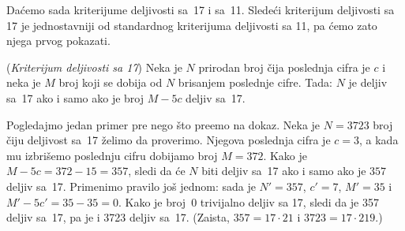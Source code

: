 
Da\'cemo sada kriterijume deljivosti sa~17 i sa~11. Slede\'ci kriterijum deljivosti sa 17 je jednostavniji od
standardnog kriterijuma deljivosti sa 11, pa \'cemo zato njega prvog pokazati.

\begin{EX} (\textit{Kriterijum deljivosti sa 17})
  Neka je $N$ prirodan broj \v cija poslednja cifra je $c$ i neka je $M$ broj koji se dobija od $N$ brisanjem poslednje cifre.
  Tada: $N$ je deljiv sa~17 ako i samo ako je broj $M - 5c$ deljiv sa~17.
\end{EX}

Pogledajmo jedan primer pre nego \v sto pre\dj emo na dokaz. Neka je $N = 3723$ broj \v ciju deljivost sa~17
\v zelimo da proverimo. Njegova poslednja cifra je $c = 3$, a kada mu izbri\v semo poslednju cifru dobijamo broj $M = 372$.
Kako je $M - 5c = 372 - 15 = 357$, sledi da \'ce $N$ biti deljiv sa~17 ako i samo ako je $357$ deljiv sa~17.
Primenimo pravilo jo\v s jednom: sada je $N' = 357$, $c' = 7$, $M' = 35$ i $M' - 5c' = 35 - 35 = 0$.
Kako je broj~0 trivijalno deljiv sa 17, sledi da je 357 deljiv sa~17, pa je i 3723 deljiv sa~17.
(Zaista, $357 = 17 \cdot 21$ i $3723 = 17 \cdot 219$.)

